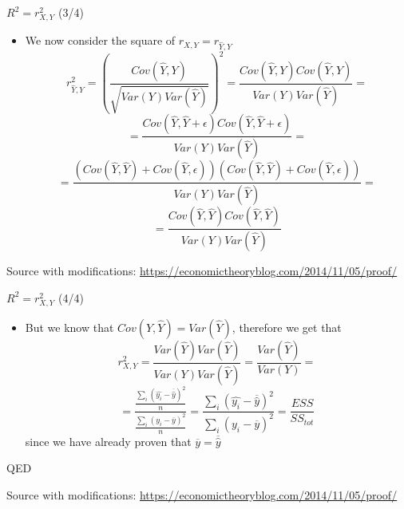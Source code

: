\documentclass{beamer}
\begin{document}
\begin{frame}
{\centerline{$R^2 = r_{X,Y}^2$ (3/4)}}
\begin{itemize}
\item We now consider the square of $r_{X,Y} = r_{\hat{Y},Y}$
$$r_{\hat{Y},Y}^2= \left ( \frac{Cov(\hat{Y},Y)}{\sqrt{Var(Y)Var(\hat{Y})}} \right )^2 =  \frac{Cov(\hat{Y},Y)Cov(\hat{Y},Y)}{Var(Y)Var(\hat{Y})} = $$
$$ = \frac{Cov(\hat{Y},\hat{Y} + \epsilon)Cov(\hat{Y},\hat{Y} + \epsilon)}{Var(Y)Var(\hat{Y})} = $$
$$ 
= \frac{(Cov(\hat{Y},\hat{Y})+ Cov(\hat{Y},\epsilon))(Cov(\hat{Y},\hat{Y})+ Cov(\hat{Y},\epsilon))}{Var(Y)Var(\hat{Y})} = $$
$$ 
= \frac{Cov(\hat{Y},\hat{Y})Cov(\hat{Y},\hat{Y})}{Var(Y)Var(\hat{Y})} $$


\end{itemize}

\begin{center}
\tiny 
Source with modifications: \url{https://economictheoryblog.com/2014/11/05/proof/}
\end{center}
\end{frame}

\begin{frame}
{\centerline{$R^2 = r_{X,Y}^2$ (4/4)}}
\begin{itemize}
\item But we know that $Cov(\hat{Y},\hat{Y}) = Var(\hat{Y})$, therefore we get that
$$r_{X,Y}^2 = \frac{Var(\hat{Y})Var(\hat{Y})}{Var(Y)Var(\hat{Y})} = \frac{Var(\hat{Y})}{Var(Y)}=$$
$$ = \frac{\frac{\sum_i{(\hat{y_i}-\overline{\hat{y}})^2}}{n}}{\frac{\sum_i(y_i-\overline{y})^2}{n}}
= \frac{{\sum_i{(\hat{y_i}-\overline{\hat{y}})^2}}}{\sum_i(y_i-\overline{y})^2} =  \frac{ESS}{SS_{tot}} $$
since we have already proven that $\overline{y} = \overline{\hat{y}}$
\end{itemize}
QED

\begin{center}
\tiny 
Source with modifications: \url{https://economictheoryblog.com/2014/11/05/proof/}
\end{center}
\end{frame}

\end{document}
